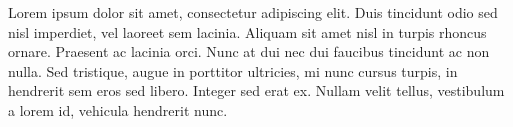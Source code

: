 \Conclusion
Lorem ipsum dolor sit amet, consectetur adipiscing elit. Duis tincidunt odio sed nisl imperdiet, vel laoreet sem lacinia. Aliquam sit amet nisl in turpis rhoncus ornare. Praesent ac lacinia orci. Nunc at dui nec dui faucibus tincidunt ac non nulla. Sed tristique, augue in porttitor ultricies, mi nunc cursus turpis, in hendrerit sem eros sed libero. Integer sed erat ex. Nullam velit tellus, vestibulum a lorem id, vehicula hendrerit nunc.